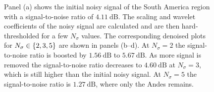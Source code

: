 \begin{figure}[htpb]
\caption[
A denoising demonstration for a map of South America
]{
Panel (a) shows the initial noisy signal of the South America region with a signal-to-noise ratio of \(\SI{4.11}{\dB}\).
The scaling and wavelet coefficients of the noisy signal are calculated and are then hard-thresholded for a few \(N_{\sigma}\) values.
The corresponding denoised plots for \(N_{\sigma} \in \{2, 3, 5\}\) are shown in panels (b--d). %
At \(N_{\sigma}=2\) the signal-to-noise ratio is boosted by \(\SI{1.56}{\dB}\) to \(\SI{5.67}{\dB}\).
As more signal is removed the signal-to-noise ratio decreases to \(\SI{4.60}{\dB}\) at \(N_{\sigma}=3\), which is still higher than the initial noisy signal.
At \(N_{\sigma}=5\) the signal-to-noise ratio is \(\SI{1.27}{\dB}\), where only the Andes remains.
}\label{fig:chapter4_denoising}
\end{figure}
